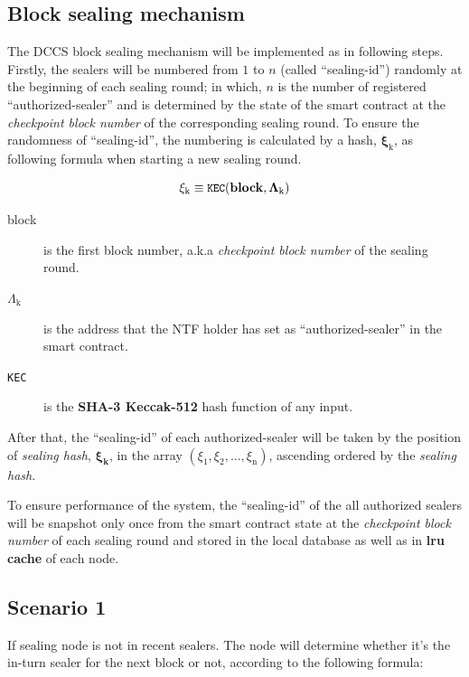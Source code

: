 \documentclass[12pt,oneside]{amsart}
\begin{document}
\begin{multicols}{2}
\section{Block sealing mechanism}\label{sec:sealing}
The {\small DCCS} block sealing mechanism will be implemented  as in following steps. Firstly, the sealers will be numbered from $1$ to $n$ (called ``sealing-id'') randomly at the beginning of each sealing round; in which, $n$ is the number of registered ``authorized-sealer'' and is determined by the state of the smart contract at the \textit{checkpoint block number} of the corresponding sealing round. To ensure the randomness of ``sealing-id'', the numbering is calculated by a hash,  $\boldsymbol{\xi_{\mathrm{k}}}$, as following formula when starting a new sealing round.

\begin{equation}
\xi_{\mathrm{k}} \equiv \texttt{\small KEC}(\mathbf{block}, \mathbf{\Lambda_{\mathrm{k}}})
\end{equation}

\begin{description}
\item[block] is the first block number, a.k.a  \textit{checkpoint block number} of the sealing round.
\item[$\Lambda_{\mathrm{k}}$] is the address that the {\small NTF} holder has set as ``authorized-sealer'' in the smart contract.
\item[\texttt{\small KEC}] is the \textbf{\small {SHA-3 Keccak-512}} hash function of any input.
\end{description}

After that, the ``sealing-id'' of each authorized-sealer will be taken by the position of \textit{sealing hash}, $\boldsymbol{\xi_k}$, in the array $(\xi_{\mathrm{1}}, \xi_{\mathrm{2}}, ..., \xi_{\mathrm{n}})$, ascending ordered by the \textit{sealing hash}.

To ensure performance of the system, the ``sealing-id'' of the all authorized sealers will be snapshot only once from the smart contract state at the \textit{checkpoint block number} of each sealing round and stored in the local database as well as in \textbf{lru cache} of each node.

\subsection{Scenario 1}\label{ch:scenario_1} If sealing node is not in recent sealers. The node will determine whether it's the in-turn sealer for the next block or not, according to the following formula:


\end{multicols}
\end{document}
